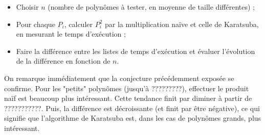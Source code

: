 \documentclass{article}
\begin{document}
\begin{itemize}
	\item Choisir $n$ (nombre de polynômes à tester, en moyenne de taille différentes) ;
	\item Pour chaque $P_i$, calculer $P_i^2$ par la multiplication naïve et celle de Karatsuba, en mesurant le temps d'exécution ;
	\item Faire la différence entre les listes de temps d'exécution et évaluer l'évolution de la différence en fonction de $n$.
\end{itemize}

On remarque immédiatement que la conjecture précédemment exposée se confirme. Pour les "petits" polynômes (jusqu'à ?????????), effectuer le produit naïf est beaucoup plus intéressant. Cette tendance finit par diminer à partir de ???????????. Puis, la différence est décroissante (et finit par être négative), ce qui signifie que l'algorithme de Karatsuba est, dans les cas de polynômes grands, plus intéressant.
\end{document}
